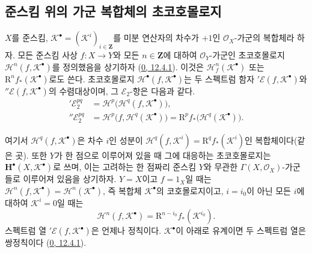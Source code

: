 \subsection{준스킴 위의 가군 복합체의 초코호몰로지}
\label{subsection:III.6.2.fr}

\begin{env}[6.2.1]
\label{III.6.2.1-fr}
$X$를 준스킴,
$\mathscr K^\bullet=(\mathscr K^i)_{i\in\mathbf Z}$를 미분 연산자의
차수가 $+1$인 $\mathscr O_X$-가군의 복합체라 하자. 모든 준스킴 사상
$f:X\to Y$와 모든 $n\in\mathbf Z$에 대하여 $\mathscr O_Y$-가군인
초코호몰로지 $\mathscr H^n(f,\mathscr K^\bullet)$를 정의했음을 상기하자
(\hyperref[0.12.4.1-fr]{0, 12.4.1}). 이것은
$\mathscr H_f^n(\mathscr K^\bullet)$ 또는
$\mathrm R^n f_*(\mathscr K^\bullet)$로도 쓴다. 초코호몰로지
$\mathscr H^\bullet(f,\mathscr K^\bullet)$는 두 스펙트럼 함자
$'\mathscr E(f,\mathscr K^\bullet)$와
$''\mathscr E(f,\mathscr K^\bullet)$의 수렴대상이며, 그
$\mathscr E_2$-항은 다음과 같다.
\begin{align}
  '\mathscr E_2^{pq}
    &=\mathscr H^p\bigl(\mathscr H^q(f,\mathscr K^\bullet)\bigr),
    \tag{6.2.1.1}\label{III.6.2.1.1.fr}\\
  ''\mathscr E_2^{pq}
    &=\mathscr H^p\bigl(f,\mathscr H^q(\mathscr K^\bullet)\bigr)
      =\mathrm R^p f_*\bigl(\mathscr H^q(\mathscr K^\bullet)\bigr).
    \tag{6.2.1.2}\label{III.6.2.1.2.fr}
\end{align}


여기서 $\mathscr H^q(f,\mathscr K^\bullet)$은 차수 $i$인 성분이
$\mathscr H^q(f,\mathscr K^i)=\mathrm R^q f_*(\mathscr K^i)$인
복합체이다(같은 곳). 또한 $Y$가 한 점으로 이루어져 있을 때 그에
대응하는 초코호몰로지는 $\mathbf H^\bullet(X,\mathscr K^\bullet)$로
쓰며, 이는 고려하는 한 점짜리 준스킴 $Y$와 무관한
$\Gamma(X,\mathscr O_X)$-가군들로 이루어져 있음을 상기하자. $Y=X$이고
$f=1_X$일 때는
$\mathscr H^n(f,\mathscr K^\bullet)=\mathscr H^n(\mathscr K^\bullet)$,
즉 복합체 $\mathscr K^\bullet$의 코호몰로지이고,
$i=i_0$이 아닌 모든 $i$에 대하여 $\mathscr K^i=0$일 때는
\[
  \mathscr H^n(f,\mathscr K^\bullet)
    =\mathrm R^{n-i_0}f_*(\mathscr K^{i_0}).
\]
스펙트럼 열 $'\mathscr E(f,\mathscr K^\bullet)$은 언제나 정칙이다.
$\mathscr K^\bullet$이 아래로 유계이면 두 스펙트럼 열은 쌍정칙이다
(\hyperref[0.12.4.1-fr]{0, 12.4.1}).


\end{env}
